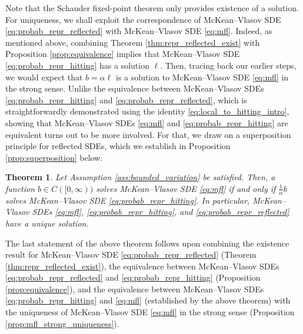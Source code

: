 \documentclass[11pt, a4paper]{article}
\theoremstyle{plain}
\newtheorem{theorem}{Theorem}[section]
\theoremstyle{definition}
\theoremstyle{remark}
\numberwithin{equation}{section}
\newcommand{\ev}{\mathbb{E}}
\renewcommand{\d}{\mathrm{d}}
\begin{document}
Note that the Schauder fixed-point theorem only provides existence of a solution. For uniqueness, we shall exploit the correspondence of McKean--Vlasov SDE \eqref{eq:probab_repr_reflected} with McKean--Vlasov SDE \eqref{eq:mfl}.
Indeed, as mentioned above, combining Theorem \ref{thm:repr_reflected_exist} with Proposition \ref{prop:equivalence} implies that McKean--Vlasov SDE \eqref{eq:probab_repr_hitting} has a solution $\ell$. Then, tracing back our earlier steps, we would expect that $b = \alpha \ell$ is a solution to McKean--Vlasov SDE \eqref{eq:mfl} in the strong sense. Unlike the equivalence between McKean--Vlasov SDEs \eqref{eq:probab_repr_hitting} and \eqref{eq:probab_repr_reflected}, which is straightforwardly demonstrated using the identity \eqref{eq:local_to_hitting_intro}, showing that McKean--Vlasov SDEs \eqref{eq:mfl} and \eqref{eq:probab_repr_hitting} are equivalent turns out to be more involved. For that, we draw on a superposition principle for reflected SDEs, which we establish in Proposition \ref{prop:superposition} below. 

\begin{theorem} \label{thm:equivalence}
Let Assumption \ref{ass:bounded_variation} be satisfied. Then, a function $b \in C([0, \infty))$ solves McKean--Vlasov SDE \eqref{eq:mfl} if and only if $\frac{1}{\alpha} b$ solves McKean--Vlasov SDE \eqref{eq:probab_repr_hitting}. In particular, McKean--Vlasov SDEs \eqref{eq:mfl}, \eqref{eq:probab_repr_hitting}, and \eqref{eq:probab_repr_reflected} have a unique solution.
\end{theorem}

The last statement of the above theorem follows upon combining the existence result for McKean--Vlasov SDE \eqref{eq:probab_repr_reflected} (Theorem \ref{thm:repr_reflected_exist}), the equivalence between McKean--Vlasov SDEs \eqref{eq:probab_repr_reflected} and \eqref{eq:probab_repr_hitting} (Proposition \ref{prop:equivalence}), and the equivalence between McKean--Vlasov SDEs \eqref{eq:probab_repr_hitting} and \eqref{eq:mfl} (established by the above theorem) with the uniqueness of McKean--Vlasov SDE \eqref{eq:mfl} in the strong sense (Proposition \ref{prop:mfl_strong_uniqueness}). 
\end{document}
